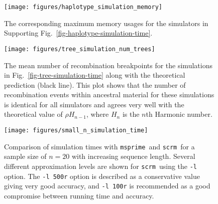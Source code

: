 \documentclass[10pt,letterpaper]{article}
\newcommand{\msprime}[0]{\texttt{msprime}}
\newcommand{\scrm}[0]{\texttt{scrm}}
\begin{document}
\begin{figure}
    \begin{center}
        \texttt{[image: figures/haplotype\_simulation\_memory]}
    \end{center}
    \caption{\label{fig-haplotype-simulation-memory} The corresponding maximum
        memory usages for the simulators in Supporting
        Fig.~\ref{fig-haplotype-simulation-time}.
        }
\end{figure}

\begin{figure}
    \begin{center}
        \texttt{[image: figures/tree\_simulation\_num\_trees]}
    \end{center}
    \caption{\label{fig-tree-simulation-num-trees} The  mean
        number of recombination breakpoints for the simulations in
        Fig.~\ref{fig-tree-simulation-time} along with the theoretical prediction
        (black line). This plot shows that the number of recombination events within ancestral
        material for these simulations is identical for all simulators and agrees
        very well with the theoretical value of $\rho H_{n - 1}$, where
        $H_n$ is the $n$th Harmonic number.
        }
\end{figure}

\begin{figure}
    \begin{center}
        \texttt{[image: figures/small\_n\_simulation\_time]}
    \end{center}
    \caption{\label{fig-small-n-simulation-time} Comparison of
    simulation times with \msprime\ and \scrm\ for a
    sample size of $n = 20$ with increasing sequence length.
    Several different approximation levels are
    shown for \scrm\ using the \texttt{-l} option. The \texttt{-l 500r} option
    is described as a conservative value giving very good accuracy,
    and \texttt{-l 100r} is recommended as a good compromise
    between running time and accuracy.}
\end{figure}
\end{document}
